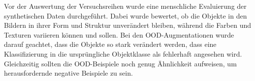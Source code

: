Vor der Auswertung der Versuchsreihen wurde eine menschliche Evaluierung der synthetischen Daten durchgeführt. Dabei wurde bewertet, ob die Objekte in den Bildern in ihrer Form und Struktur unverändert bleiben, während die Farben und Texturen variieren können und sollen. Bei den OOD-Augmentationen wurde darauf geachtet, dass die Objekte so stark verändert werden, dass eine Klassifizierung in die ursprüngliche Objektklasse als fehlerhaft angesehen wird. Gleichzeitig sollten die OOD-Beispiele noch genug Ähnlichkeit aufweisen, um herausfordernde negative Beispiele zu sein.